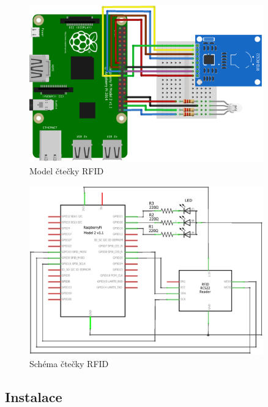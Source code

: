 \documentclass[czech,BP]{thesiskiv}
\begin{document}
\begin{figure}[H]
	\centering
	\includegraphics[width=0.9\textwidth]{../diagrams/reader_rfid_diagram_bb.png}	
	\caption{Model čtečky RFID}
	\label{fig:reader_rfid_diagram_bb}
\end{figure}	
	
\begin{figure}[H]
	\centering
	\includegraphics[width=0.9\textwidth]{../diagrams/reader_rfid_diagram_schem.png}	
	\caption{Schéma čtečky RFID}
	\label{fig:reader_rfid_diagram_schem}
\end{figure}

\subsection{Instalace}
\end{document}
